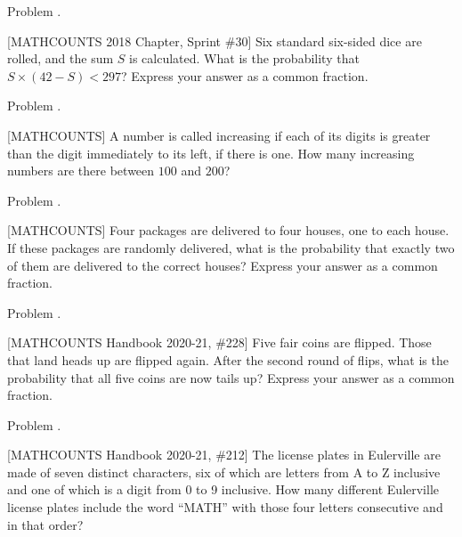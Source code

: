 \documentclass[9pt]{beamer}
\newcounter{problem}[section]
\begin{document}
\begin{frame}[t, fragile]{Problem \thesection.\theproblem}
    \begin{block}{}[MATHCOUNTS 2018 Chapter, Sprint \#30]
    Six standard six-sided dice are rolled, and the sum $S$ is calculated. What is the probability that $S \times (42 - S ) < 297$? Express your answer as a common fraction.
    
    
    \end{block}
\end{frame}

\begin{frame}[t, fragile]{Problem \thesection.\theproblem}
    \begin{block}{}[MATHCOUNTS]
    A number is called increasing if each of its digits is greater than the digit immediately to its left, if there is one. How many increasing numbers are there between $100$ and $200$?
	
    \end{block}
\end{frame}

\begin{frame}[t, fragile]{Problem \thesection.\theproblem}
    \begin{block}{}[MATHCOUNTS]
    Four packages are delivered to four houses, one to each house. If these packages are randomly delivered, what is the probability that exactly two of them are delivered to the correct houses? Express your answer as a common fraction.
	
    \end{block}
\end{frame}


\begin{frame}[t, fragile]{Problem \thesection.\theproblem}
    \begin{block}{}[MATHCOUNTS Handbook 2020-21, \#228]
     Five fair coins are flipped. Those that land heads up are flipped again. After the second round of flips, what is the probability that all five coins are now tails up? Express your answer as a common fraction. 
     
    \end{block}
\end{frame}

\begin{frame}[t, fragile]{Problem \thesection.\theproblem}
    \begin{block}{}[MATHCOUNTS Handbook 2020-21, \#212]
     The license plates in Eulerville are made of seven distinct characters, six of which are letters from A to Z inclusive and one of which is a digit from 0 to 9 inclusive. How many different Eulerville license plates include the word ``MATH'' with those four letters consecutive and in that order?
     
    \end{block}
\end{frame}
\end{document}
